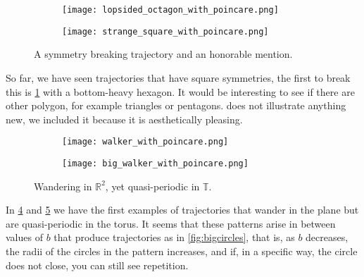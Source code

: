 \begin{figure}[!th]
\centering
\begin{subfigure}{0.49\textwidth}
\centering
\texttt{[image: lopsided\_octagon\_with\_poincare.png]}
\caption{}
\label{subfig:lopsidedhexagon}
\end{subfigure}
%
\begin{subfigure}{0.49\textwidth}
\texttt{[image: strange\_square\_with\_poincare.png]}
\caption{}
\label{subfig:strangesquare}
\end{subfigure}
\caption{A symmetry breaking trajectory and an honorable mention.}
\label{fig:honorablementions}
\end{figure}

So far, we have seen trajectories that have square symmetries, the first to break this is \ref{subfig:lopsidedhexagon} with a bottom-heavy hexagon. It would be interesting to see if there are other polygon, for example triangles or pentagons.  does not illustrate anything new, we included it because it is aesthetically pleasing.

\begin{figure}[!th]
\centering
\begin{subfigure}{0.49\textwidth}
\texttt{[image: walker\_with\_poincare.png]}
\caption{}
\label{subfig:walker1}
\end{subfigure}
%
\begin{subfigure}{0.49\textwidth}
\texttt{[image: big\_walker\_with\_poincare.png]}
\caption{}
\label{subfig:walker2}
\end{subfigure}
\caption{Wandering in $\mathbb R^2$, yet quasi-periodic in $\mathbb T$.}
\label{fig:walkers}
\end{figure}

In \cref{subfig:walker1} and \ref{subfig:walker2} we have the first examples of trajectories that wander in the plane but are quasi-periodic in the torus. It seems that these patterns arise in between values of $b$ that produce trajectories as in \cref{fig:bigcircles}, that is, as $b$ decreases, the radii of the circles in the pattern increases, and if, in a specific way, the circle does not close, you can still see repetition.

